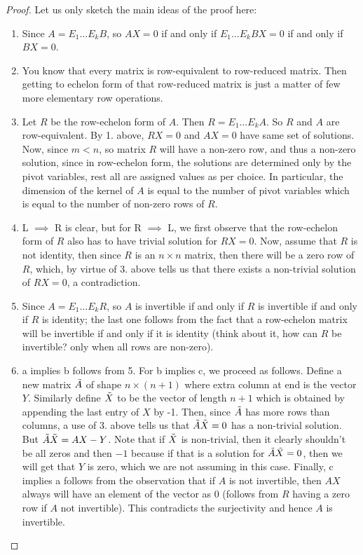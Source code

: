 \documentclass[letterpaper,11pt,twoside]{article}
\theoremstyle{definition}
\theoremstyle{definition}
\theoremstyle{definition}
\theoremstyle{definition}
\theoremstyle{definition}
\theoremstyle{definition}
\theoremstyle{remark}
\theoremstyle{definition}
\begin{document}
	\begin{proof}
	Let us only sketch the main ideas of the proof here:
    \begin{enumerate}
        \item {Since $A = E_1\dots E_k B$, so $AX = 0$ if and only if $E_1\dots E_k BX = 0$ if and only if $BX = 0$.}
        \item{You know that every matrix is row-equivalent to row-reduced matrix. Then getting to echelon form of that row-reduced matrix is just a matter of few more elementary row operations.}
        \item{Let $R$ be the row-echelon form of $A$. Then $R = E_1\dots E_k A$. So $R$ and $A$ are row-equivalent. By 1. above, $RX= 0$ and $AX = 0$ have same set of solutions. Now, since $m<n$, so matrix $R$ will have a non-zero row, and thus a non-zero solution, since in row-echelon form, the solutions are determined only by the pivot variables, rest all are assigned values as per choice. In particular, the dimension of the kernel of $A$ is equal to the number of pivot variables which is equal to the number of non-zero rows of $R$.}
        \item{L $\implies$ R is clear, but for R $\implies$ L, we first observe that the row-echelon form of $R$ also has to have trivial solution for $RX = 0$. Now, assume that $R$ is not identity, then since $R$ is an $n\times n$ matrix, then there will be a zero row of $R$, which, by virtue of 3. above tells us that there exists a non-trivial solution of $RX = 0$, a contradiction.}
        \item{Since $A = E_1\dots E_k R$, so $A$ is invertible if and only if $R$ is invertible if and only if $R$ is identity; the last one follows from the fact that a row-echelon matrix will be invertible if and only if it is identity (think about it, how can $R$ be invertible? only when all rows are non-zero).}
        \item {a implies b follows from 5. For b implies c, we proceed as follows. Define a new matrix $\Tilde{A}$ of shape $n\times (n+1)$ where extra column at end is the vector $Y$. Similarly define $\Tilde{X}$ to be the vector of length $n+1$ which is obtained by appending the last entry of $X$ by -1. Then, since $\Tilde{A}$ has more rows than columns, a use of 3. above tells us that $\Tilde{A}\Tilde{X} = 0$ has a non-trivial solution. But $\Tilde{A}\Tilde{X} = AX-Y$. Note that if $\Tilde{X}$ is non-trivial, then it clearly shouldn't be all zeros and then $-1$ because if that is a solution for $\Tilde{A}\Tilde{X} = 0$, then we will get that $Y$ is zero, which we are not assuming in this case. Finally, c implies a follows from the observation that if $A$ is not invertible, then $AX$ always will have an element of the vector as 0 (follows from $R$ having a zero row if $A$ not invertible). This contradicts the surjectivity and hence $A$ is invertible.}
    \end{enumerate}
	\end{proof}
\end{document}
